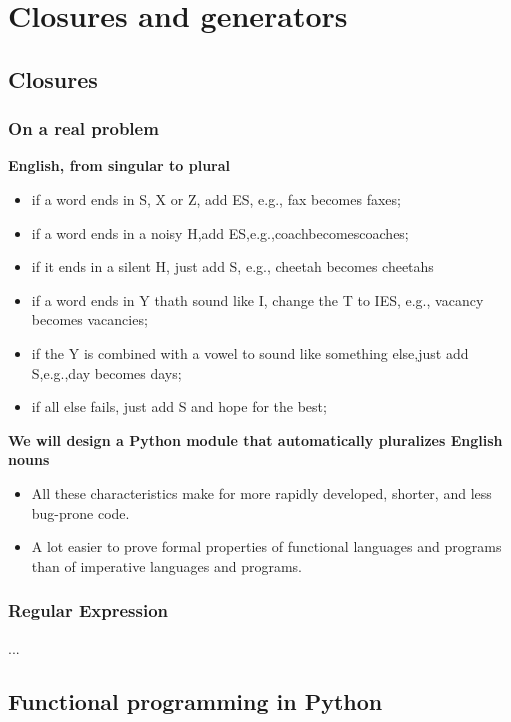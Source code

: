 \section{Closures and generators}

\subsection{Closures}

\subsubsection{On a real problem}

\textbf{English, from singular to plural}
\begin{itemize}
	\item if a word ends in S, X or Z, add ES, e.g., fax becomes faxes;
	\item if a word ends in a noisy H,add ES,e.g.,coachbecomescoaches;
	\item if it ends in a silent H, just add S, e.g., cheetah becomes cheetahs
	\item if a word ends in Y thath sound like I, change the T to IES, e.g., vacancy becomes vacancies;
	\item if the Y is combined with a vowel to sound like something else,just  add S,e.g.,day becomes days;
	\item if all else fails, just add S and hope for the best;
\end{itemize}

\textbf{We will design a Python module that automatically pluralizes English nouns}

\begin{itemize}
	\item All these characteristics make for more rapidly developed, shorter, and less bug-prone code.
	\item A lot easier to prove formal properties of functional languages and programs than of imperative languages and programs.
\end{itemize}

\subsubsection{Regular Expression}
...

\subsection{Functional programming in Python}

